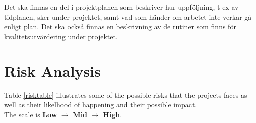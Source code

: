 \documentclass{article}
\begin{document}
        

Det ska finnas en del i projektplanen som beskriver hur uppföljning, t ex av
tidplanen, sker under projektet, samt vad som händer om arbetet inte verkar
gå enligt plan. Det ska också finnas en beskrivning av de rutiner som finns för
kvalitetsutvärdering under projektet.

    

\section{Risk Analysis}

    Table \ref{risktable} illustrates some of the possible risks that the projects
    faces as well as their likelhood of happening and their possible impact.
    \\
    The scale is \textbf{Low} $\rightarrow$ \textbf{Mid} $\rightarrow$ \textbf{High}.
\end{document}

